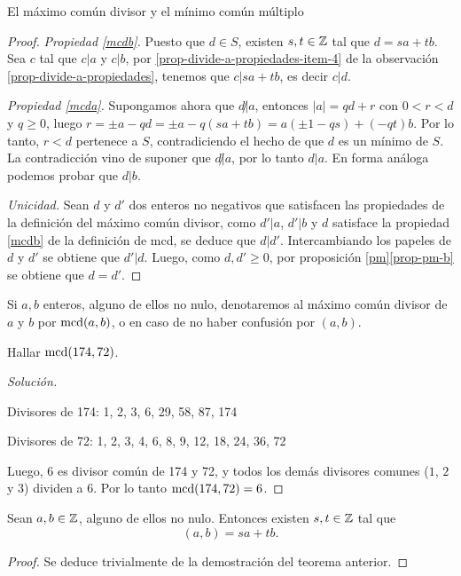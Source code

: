 \begin{section}{El máximo común divisor y el mínimo común múltiplo}
\begin{proof}
    \textit{Propiedad {\ref{mcdb}}.} Puesto  que $d \in S$,  existen $s, t \in {\mathbb Z}$ tal que $d = sa+tb$. Sea $c$ tal que $c|a$ y $c|b$, por \ref{prop-divide-a-propiedades-item-4} de la observación \ref{prop-divide-a-propiedades},  tenemos que $c|sa+tb$,  es decir $c|d$. 
    
    \textit{Propiedad {\ref{mcda}}.} Supongamos ahora que $d \not| a$,  entonces $|a| = qd + r$ con $0 < r <d$ y $q \ge 0$, luego $r = \pm a - qd = \pm a-q(sa+tb) = a(\pm1-qs) +(-qt)b$. Por lo tanto,  $r < d$  pertenece a $S$, contradiciendo  el hecho de que $d$  es un mínimo de $S$. La contradicción vino de suponer que  $d \not| a$, por lo tanto $d|a$. En  forma análoga podemos probar que $d|b$. 
    
    
    \textit{Unicidad.} Sean $d$ y $d'$ dos enteros no negativos que satisfacen las propiedades de la definición del máximo común divisor, como $d'|a$, $d'|b$ y  $d$ satisface la propiedad {\ref{mcdb}} de la definición de mcd, se deduce que $d|d'$. Intercambiando  los papeles de $d$ y $d'$ se obtiene que $d'|d$. Luego, como $d,d'\ge 0$, por  proposición \ref{pm}\ref{prop-pm-b} se obtiene que $d=d'$.
\end{proof}

Si $a,b$ enteros,  alguno de ellos  no nulo,  denotaremos al máximo común divisor  de $a$ y $b$ por $\operatorname{mcd}(a,b)$, o en caso de no haber confusión por $(a,b)$.



\begin{ejemplo*} Hallar   $\operatorname{mcd}(174,72)$.
    \begin{proof}[Solución] ${^{}}$
        
        Divisores de 174: 1, 2, 3, 6, 29, 58, 87, 174
        
        Divisores de 72: 1, 2, 3, 4, 6, 8, 9, 12, 18, 24, 36, 72 
        
        Luego, $6$ es divisor común de 174 y 72, y todos los demás divisores comunes ($1$, $2$ y $3$) dividen a $6$. Por lo tanto $\operatorname{mcd}(174,72) =6$.
    \end{proof}
\end{ejemplo*}

\begin{proposicion}\label{prop-d-comb-lin}
    Sean $a,b \in {\mathbb Z}$, alguno de ellos no nulo. Entonces existen $s,t \in {\mathbb Z}$ tal que
    \begin{equation*}
    (a,b) = sa + tb. 
    \end{equation*}
\end{proposicion}
\begin{proof}
    Se deduce trivialmente de la demostración del teorema anterior. 
\end{proof}


\end{section}

